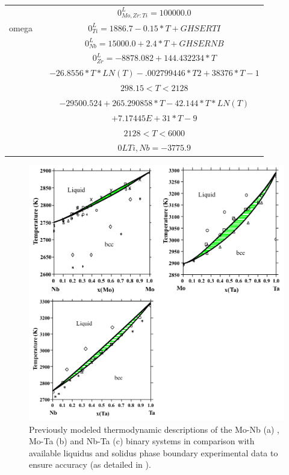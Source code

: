 \begin{longtable}[H]{ c c c }
                               & \cite{Kar2008} & $0^\textit{L}_{Mo,Zr:Ti} = 100000.0$\\
                  omega & \cite{Zhang2001} & $0^\textit{L}_{Ti} = 1886.7-0.15*T+GHSERTI$\\
                               & \cite{Zhang2001} &$0^\textit{L}_{Nb} = 15000.0+2.4*T+GHSERNB$\\
                               & \cite{Dinsdale1991} & $0^\textit{L}_{Zr} = -8878.082+144.432234*T$\\
                               &                               & $-26.8556*T*LN(T)-.002799446*T2+38376*T-1$\\                      
                               &      & $298.15 < T < 2128$\\
                               &      & $-29500.524+265.290858*T-42.144*T*LN(T)$\\
                               &      & $+7.17445E+31*T-9$\\          
                               &      &  $2128 < T< 6000$\\
                               & \cite{Zhang2001} & $0LTi,Nb = -3775.9$\\
		\hline
\end{longtable}



\newpage
\begin{figure}[H]
	\centering
	\includegraphics[width=\textwidth]{Chapter-3/Figures/binary1.png}
	\caption{Previously modeled thermodynamic descriptions of the Mo-Nb (a) \cite{Xiong2004}, Mo-Ta (b) \cite{Xiong2004} and Nb-Ta (c) \cite{Xiong2004} binary systems in comparison with available liquidus and solidus phase boundary experimental data to ensure accuracy (as detailed in \cite{Xiong2004}). }
	\label{Ch3-figure:binary1}
\end{figure}

